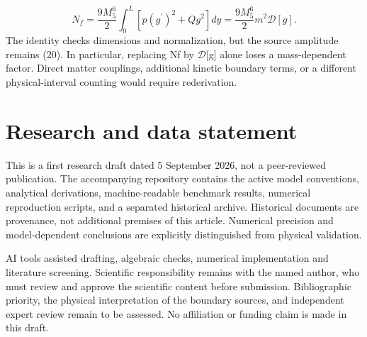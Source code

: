 \documentclass[11pt]{article}
\begin{document}
\begin{equation}
N_f=\frac{9M_5^6}{2}\int_0^L\left[p(g^\prime)^2+Qg^2\right]dy=\frac{9M_5^6}{2}m^2\mathcal{D}[g].\tag{A4}
\end{equation}
The identity checks dimensions and normalization, but the source amplitude remains (20). In particular, replacing Nf by \(\mathcal D\)[g] alone loses a mass-dependent factor. Direct matter couplings, additional kinetic boundary terms, or a different physical-interval counting would require rederivation.

\section*{Research and data statement}
This is a first research draft dated 5 September 2026, not a peer-reviewed publication. The accompanying repository contains the active model conventions, analytical derivations, machine-readable benchmark results, numerical reproduction scripts, and a separated historical archive. Historical documents are provenance, not additional premises of this article. Numerical precision and model-dependent conclusions are explicitly distinguished from physical validation.

AI tools assisted drafting, algebraic checks, numerical implementation and literature screening. Scientific responsibility remains with the named author, who must review and approve the scientific content before submission. Bibliographic priority, the physical interpretation of the boundary sources, and independent expert review remain to be assessed. No affiliation or funding claim is made in this draft.
\end{document}
